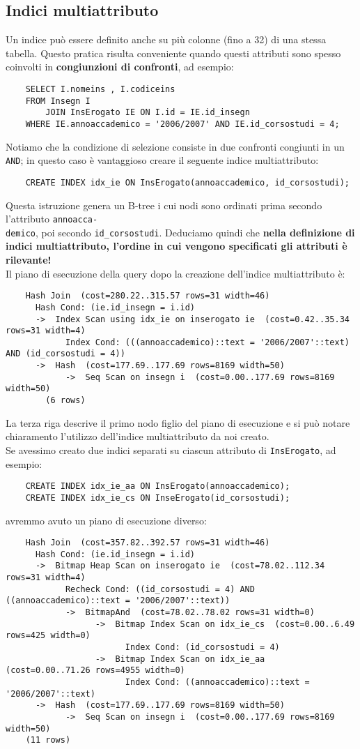 \documentclass[12pt,a4paper]{book}
\begin{document}
	\subsection{Indici multiattributo} Un indice può essere definito anche su più colonne (fino a 32) di una stessa tabella. Questo pratica risulta conveniente quando questi attributi sono spesso coinvolti in \textbf{congiunzioni di confronti}, ad esempio:
	\begin{lstlisting}
	SELECT I.nomeins , I.codiceins 
	FROM Insegn I
		JOIN InsErogato IE ON I.id = IE.id_insegn 
	WHERE IE.annoaccademico = '2006/2007' AND IE.id_corsostudi = 4;
	\end{lstlisting}
	Notiamo che la condizione di selezione consiste in due confronti congiunti in un \texttt{AND}; in questo caso è vantaggioso creare il seguente indice multiattributo:
	\begin{lstlisting}
	CREATE INDEX idx_ie ON InsErogato(annoaccademico, id_corsostudi);
	\end{lstlisting}
	Questa istruzione genera un B-tree i cui nodi sono ordinati prima secondo l'attributo \texttt{annoacca-}\\ \texttt{demico}, poi secondo \texttt{id_corsostudi}. Deduciamo quindi che \textbf{nella definizione di indici multiattributo, l'ordine in cui vengono specificati gli attributi è rilevante!}\\
	Il piano di esecuzione della query dopo la creazione dell'indice multiattributo è:
	\begin{lstlisting}
	Hash Join  (cost=280.22..315.57 rows=31 width=46)
	  Hash Cond: (ie.id_insegn = i.id)
	  ->  Index Scan using idx_ie on inserogato ie  (cost=0.42..35.34 rows=31 width=4)
			Index Cond: (((annoaccademico)::text = '2006/2007'::text) AND (id_corsostudi = 4))
	  ->  Hash  (cost=177.69..177.69 rows=8169 width=50)
			->  Seq Scan on insegn i  (cost=0.00..177.69 rows=8169 width=50)
		(6 rows)
	\end{lstlisting}
	La terza riga descrive il primo nodo figlio del piano di esecuzione e si può notare chiaramento l'utilizzo dell'indice multiattributo da noi creato.\\
	Se avessimo creato due indici separati su ciascun attributo di \texttt{InsErogato}, ad esempio:
	\begin{lstlisting}
	CREATE INDEX idx_ie_aa ON InsErogato(annoaccademico);
	CREATE INDEX idx_ie_cs ON InseErogato(id_corsostudi);
	\end{lstlisting}
	avremmo avuto un piano di esecuzione diverso:
	\begin{lstlisting}
	Hash Join  (cost=357.82..392.57 rows=31 width=46)
	  Hash Cond: (ie.id_insegn = i.id)
	  ->  Bitmap Heap Scan on inserogato ie  (cost=78.02..112.34 rows=31 width=4)
			Recheck Cond: ((id_corsostudi = 4) AND ((annoaccademico)::text = '2006/2007'::text))
			->  BitmapAnd  (cost=78.02..78.02 rows=31 width=0)
				  ->  Bitmap Index Scan on idx_ie_cs  (cost=0.00..6.49 rows=425 width=0)
						Index Cond: (id_corsostudi = 4)
				  ->  Bitmap Index Scan on idx_ie_aa  (cost=0.00..71.26 rows=4955 width=0)
						Index Cond: ((annoaccademico)::text = '2006/2007'::text)
	  ->  Hash  (cost=177.69..177.69 rows=8169 width=50)
			->  Seq Scan on insegn i  (cost=0.00..177.69 rows=8169 width=50)
	(11 rows)
	\end{lstlisting}
\end{document}
